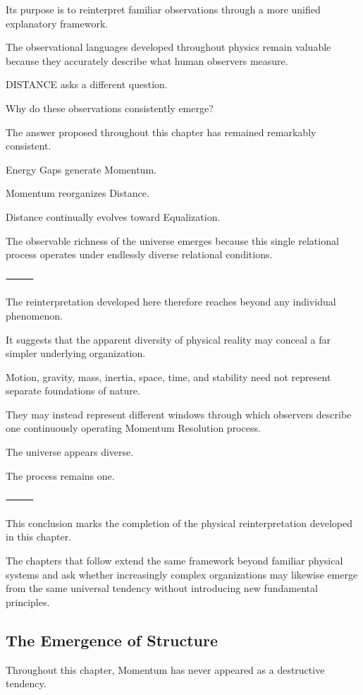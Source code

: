 Its purpose is to reinterpret familiar observations through a more unified explanatory framework.

The observational languages developed throughout physics remain valuable because they accurately describe what human observers measure.

DISTANCE asks a different question.

Why do these observations consistently emerge?

The answer proposed throughout this chapter has remained remarkably consistent.

Energy Gaps generate Momentum.

Momentum reorganizes Distance.

Distance continually evolves toward Equalization.

The observable richness of the universe emerges because this single relational process operates under endlessly diverse relational conditions.

⸻

The reinterpretation developed here therefore reaches beyond any individual phenomenon.

It suggests that the apparent diversity of physical reality may conceal a far simpler underlying organization.

Motion, gravity, mass, inertia, space, time, and stability need not represent separate foundations of nature.

They may instead represent different windows through which observers describe one continuously operating Momentum Resolution process.

The universe appears diverse.

The process remains one.

⸻

This conclusion marks the completion of the physical reinterpretation developed in this chapter.

The chapters that follow extend the same framework beyond familiar physical systems and ask whether increasingly complex organizations may likewise emerge from the same universal tendency without introducing new fundamental principles.

\subsection*{\textbf{The Emergence of Structure}}

Throughout this chapter, Momentum has never appeared as a destructive tendency.

